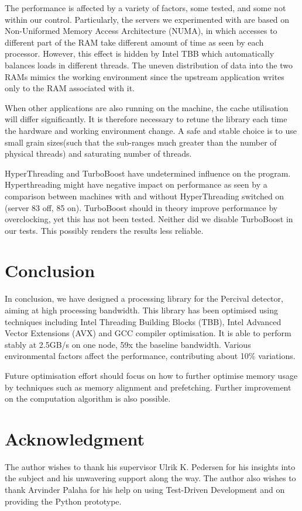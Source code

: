 \documentclass[journal]{IEEEtran}
\begin{document}
The performance is affected by a variety of factors, some tested, and some not within our control. Particularly, the servers we experimented with are based on Non-Uniformed Memory Access Architecture (NUMA), in which accesses to different part of the RAM take different amount of time as seen by each processor. However, this effect is hidden by Intel TBB which automatically balances loads in different threads. The uneven distribution of data into the two RAMs mimics the working environment since the upstream application writes only to the RAM associated with it.

When other applications are also running on the machine, the cache utilisation will differ significantly. It is therefore necessary to retune the library each time the hardware and working environment change. A safe and stable choice is to use small grain sizes(such that the sub-ranges much greater than the number of physical threads) and saturating number of threads. 

HyperThreading and TurboBoost have undetermined influence on the program. Hyperthreading might have negative impact on performance as seen by a comparison between machines with and without HyperThreading switched on (server 83 off, 85 on). TurboBoost should in theory improve performance by overclocking, yet this has not been tested. Neither did we disable TurboBoost in our tests. This possibly renders the results less reliable.

\section{Conclusion}	%
In conclusion, we have designed a processing library for the Percival detector, aiming at high processing bandwidth. This library has been optimised using techniques including Intel Threading Building Blocks (TBB), Intel Advanced Vector Extensions (AVX) and GCC compiler optimisation. It is able to perform stably at 2.5GB/s on one node, 59x the baseline bandwidth. Various environmental factors affect the performance, contributing about 10$\%$ variations.

Future optimisation effort should focus on how to further optimise memory usage by techniques such as memory alignment and prefetching. Further improvement on the computation algorithm is also possible.

\section*{Acknowledgment}
The author wishes to thank his supervisor Ulrik K. Pedersen for his insights into the subject and his unwavering support along the way. The author also wishes to thank Arvinder Palaha for his help on using Test-Driven Development and on providing the Python prototype.
\end{document}

